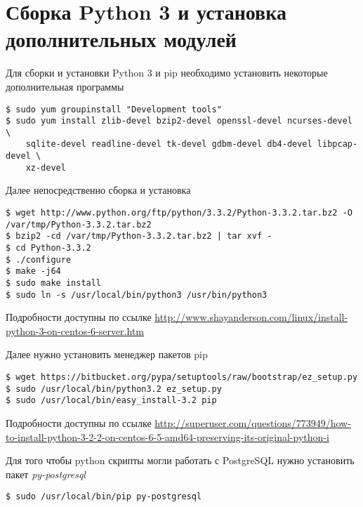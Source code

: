 \section{Сборка Python 3 и установка дополнительных модулей}
Для сборки и установки Python 3 и pip необходимо установить некоторые дополнительная программы
\begin{lstlisting}
$ sudo yum groupinstall "Development tools"
$ sudo yum install zlib-devel bzip2-devel openssl-devel ncurses-devel \
    sqlite-devel readline-devel tk-devel gdbm-devel db4-devel libpcap-devel \
    xz-devel
\end{lstlisting}
Далее непосредственно сборка и установка
\begin{lstlisting}
$ wget http://www.python.org/ftp/python/3.3.2/Python-3.3.2.tar.bz2 -O /var/tmp/Python-3.3.2.tar.bz2
$ bzip2 -cd /var/tmp/Python-3.3.2.tar.bz2 | tar xvf -
$ cd Python-3.3.2
$ ./configure
$ make -j64
$ sudo make install
$ sudo ln -s /usr/local/bin/python3 /usr/bin/python3
\end{lstlisting}
Подробности доступны по ссылке \url{http://www.shayanderson.com/linux/install-python-3-on-centos-6-server.htm}

Далее нужно установить менеджер пакетов pip
\begin{lstlisting}
$ wget https://bitbucket.org/pypa/setuptools/raw/bootstrap/ez_setup.py
$ sudo /usr/local/bin/python3.2 ez_setup.py
$ sudo /usr/local/bin/easy_install-3.2 pip
\end{lstlisting}
Подробности доступны по ссылке \url{http://superuser.com/questions/773949/how-to-install-python-3-2-2-on-centos-6-5-amd64-preserving-its-original-python-i}

Для того чтобы python скрипты могли работать с PostgreSQL нужно установить пакет \emph{py-postgresql}
\begin{lstlisting}
$ sudo /usr/local/bin/pip py-postgresql
\end{lstlisting}

